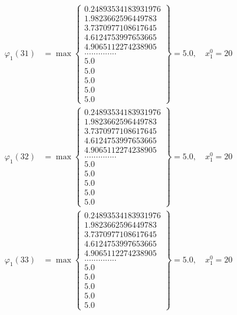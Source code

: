 \documentclass{article}
\begin{document}
\begin{align*}
  
  
  
\varphi_{1}(31) &= \max \left\{ \begin{array}{c}
0.24893534183931976 \\
 1.9823662596449783 \\
 3.7370977108617645 \\
 4.6124753997653665 \\
 4.9065112274238905 \\
 .............. \\
 5.0 \\
 5.0 \\
 5.0 \\
 5.0 \\
 5.0
\end{array} \right\} = 5.0, \quad x_{1}^0 = 20\\
  
  
  
  
\varphi_{1}(32) &= \max \left\{ \begin{array}{c}
0.24893534183931976 \\
 1.9823662596449783 \\
 3.7370977108617645 \\
 4.6124753997653665 \\
 4.9065112274238905 \\
 .............. \\
 5.0 \\
 5.0 \\
 5.0 \\
 5.0 \\
 5.0
\end{array} \right\} = 5.0, \quad x_{1}^0 = 20\\
  
  
  
  
\varphi_{1}(33) &= \max \left\{ \begin{array}{c}
0.24893534183931976 \\
 1.9823662596449783 \\
 3.7370977108617645 \\
 4.6124753997653665 \\
 4.9065112274238905 \\
 .............. \\
 5.0 \\
 5.0 \\
 5.0 \\
 5.0 \\
 5.0
\end{array} \right\} = 5.0, \quad x_{1}^0 = 20\\
  

\end{align*}
\end{document}

